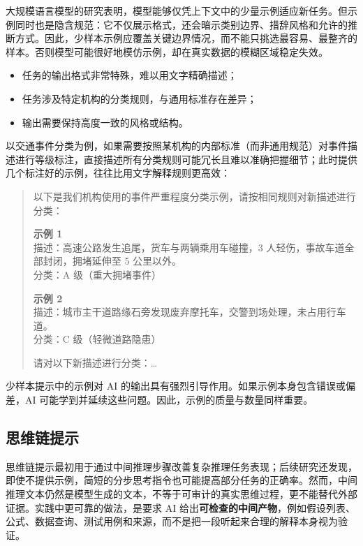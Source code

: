 大规模语言模型的研究表明，模型能够仅凭上下文中的少量示例适应新任务\cite{brown2020language}。但示例同时也是隐含规范：它不仅展示格式，还会暗示类别边界、措辞风格和允许的推断方式。因此，少样本示例应覆盖关键边界情况，而不能只挑选最容易、最整齐的样本。否则模型可能很好地模仿示例，却在真实数据的模糊区域稳定失效。

\begin{itemize}
  \item 任务的输出格式非常特殊，难以用文字精确描述；
  \item 任务涉及特定机构的分类规则，与通用标准存在差异；
  \item 输出需要保持高度一致的风格或结构。
\end{itemize}

以交通事件分类为例，如果需要按照某机构的内部标准（而非通用规范）对事件描述进行等级标注，直接描述所有分类规则可能冗长且难以准确把握细节；此时提供几个标注好的示例，往往比用文字解释规则更高效：

\begin{quote}
以下是我们机构使用的事件严重程度分类示例，请按相同规则对新描述进行分类：

\smallskip
\textbf{示例 1}\\
描述：高速公路发生追尾，货车与两辆乘用车碰撞，3 人轻伤，事故车道全部封闭，拥堵延伸至 5 公里以外。\\
分类：A 级（重大拥堵事件）

\smallskip
\textbf{示例 2}\\
描述：城市主干道路缘石旁发现废弃摩托车，交警到场处理，未占用行车道。\\
分类：C 级（轻微道路隐患）

\smallskip
请对以下新描述进行分类：\ldots
\end{quote}

少样本提示中的示例对 AI 的输出具有强烈引导作用。如果示例本身包含错误或偏差，AI 可能学到并延续这些问题。因此，示例的质量与数量同样重要。

\subsection{思维链提示}

思维链提示最初用于通过中间推理步骤改善复杂推理任务表现\cite{wei2022chain}；后续研究还发现，即使不提供示例，简短的分步思考指令也可能提高部分任务的正确率\cite{kojima2022large}。然而，中间推理文本仍然是模型生成的文本，不等于可审计的真实思维过程，更不能替代外部证据。实践中更可靠的做法，是要求 AI 给出\textbf{可检查的中间产物}，例如假设列表、公式、数据查询、测试用例和来源，而不是把一段听起来合理的解释本身视为验证。

